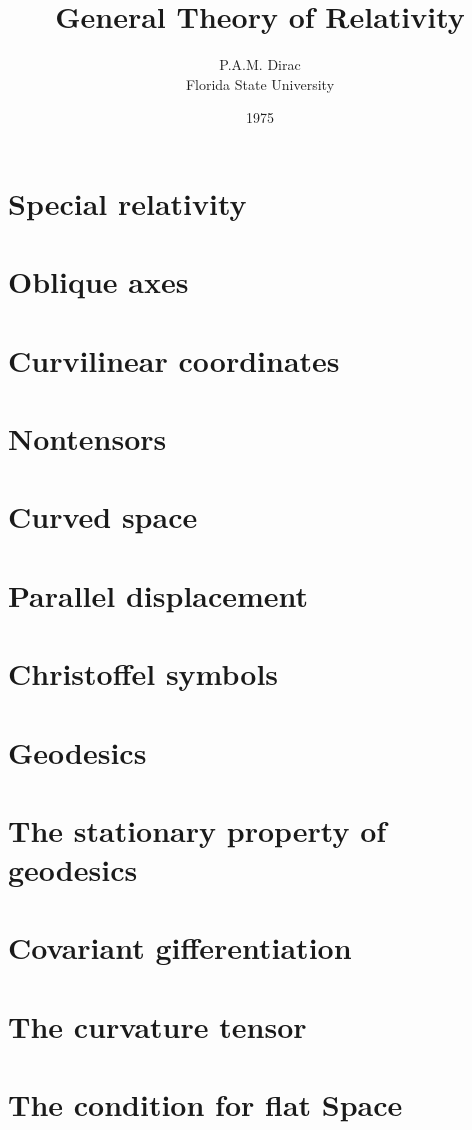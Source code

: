 \documentclass[12pt]{article}
\title{General Theory of Relativity}
\author{P.A.M. Dirac\\Florida State University}
\date{1975}
\numberwithin{equation}{section}
\begin{document}
\maketitle
\section{Special relativity}

\section{Oblique axes}

\section{Curvilinear coordinates}

\section{Nontensors}

\section{Curved space}

\section{Parallel displacement}

\section{Christoffel symbols}

\section{Geodesics}

\section{The stationary property of geodesics}

\section{Covariant gifferentiation}

\section{The curvature tensor}

\section{The condition for flat Space}

\end{document}
